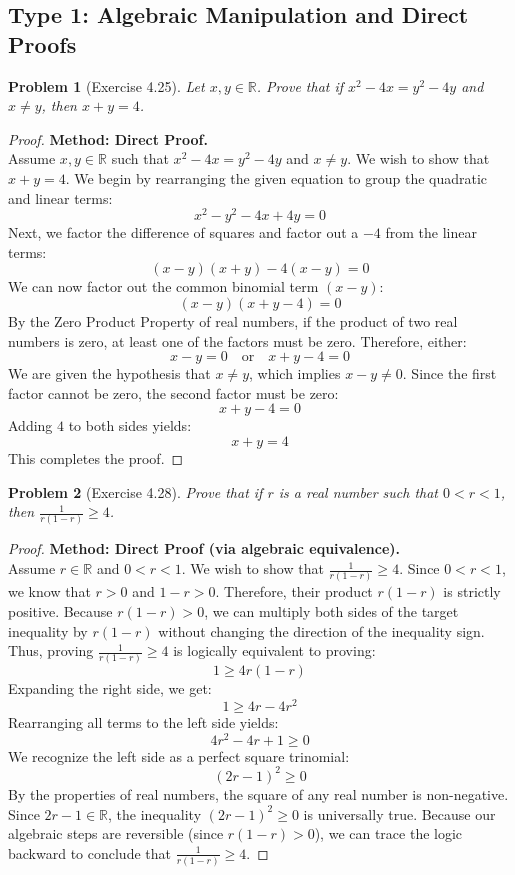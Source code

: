 \documentclass[11pt]{article}
\newtheorem{problem}{Problem}
\newcommand{\R}{\mathbb{R}}
\begin{document}
\subsection{Type 1: Algebraic Manipulation and Direct Proofs}

\begin{problem}[Exercise 4.25]
Let $x, y \in \R$. Prove that if $x^2 - 4x = y^2 - 4y$ and $x \neq y$, then $x + y = 4$.
\end{problem}
\begin{proof}
\textbf{Method: Direct Proof.} \\
Assume $x, y \in \R$ such that $x^2 - 4x = y^2 - 4y$ and $x \neq y$. We wish to show that $x + y = 4$.
We begin by rearranging the given equation to group the quadratic and linear terms:
\[ x^2 - y^2 - 4x + 4y = 0 \]
Next, we factor the difference of squares and factor out a $-4$ from the linear terms:
\[ (x - y)(x + y) - 4(x - y) = 0 \]
We can now factor out the common binomial term $(x - y)$:
\[ (x - y)(x + y - 4) = 0 \]
By the Zero Product Property of real numbers, if the product of two real numbers is zero, at least one of the factors must be zero. Therefore, either:
\[ x - y = 0 \quad \text{or} \quad x + y - 4 = 0 \]
We are given the hypothesis that $x \neq y$, which implies $x - y \neq 0$. Since the first factor cannot be zero, the second factor must be zero:
\[ x + y - 4 = 0 \]
Adding $4$ to both sides yields:
\[ x + y = 4 \]
This completes the proof.
\end{proof}

\begin{problem}[Exercise 4.28]
Prove that if $r$ is a real number such that $0 < r < 1$, then $\frac{1}{r(1-r)} \ge 4$.
\end{problem}
\begin{proof}
\textbf{Method: Direct Proof (via algebraic equivalence).} \\
Assume $r \in \R$ and $0 < r < 1$. We wish to show that $\frac{1}{r(1-r)} \ge 4$.
Since $0 < r < 1$, we know that $r > 0$ and $1 - r > 0$. Therefore, their product $r(1-r)$ is strictly positive. 
Because $r(1-r) > 0$, we can multiply both sides of the target inequality by $r(1-r)$ without changing the direction of the inequality sign. Thus, proving $\frac{1}{r(1-r)} \ge 4$ is logically equivalent to proving:
\[ 1 \ge 4r(1-r) \]
Expanding the right side, we get:
\[ 1 \ge 4r - 4r^2 \]
Rearranging all terms to the left side yields:
\[ 4r^2 - 4r + 1 \ge 0 \]
We recognize the left side as a perfect square trinomial:
\[ (2r - 1)^2 \ge 0 \]
By the properties of real numbers, the square of any real number is non-negative. Since $2r - 1 \in \R$, the inequality $(2r - 1)^2 \ge 0$ is universally true. Because our algebraic steps are reversible (since $r(1-r) > 0$), we can trace the logic backward to conclude that $\frac{1}{r(1-r)} \ge 4$.
\end{proof}
\end{document}
